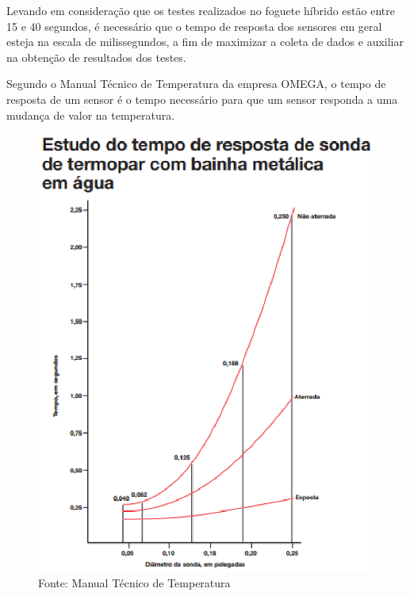 Levando em consideração que os testes realizados no foguete híbrido estão entre 15 e 40 segundos, é necessário que o tempo de resposta dos sensores em geral esteja na escala de milissegundos, a fim de maximizar a coleta de dados e auxiliar na obtenção de resultados dos testes.

Segundo o Manual Técnico de Temperatura da empresa OMEGA, o tempo de resposta de um sensor é o tempo necessário para que um sensor responda a uma mudança de valor na temperatura.
\begin{figure}[!htb]                  
	\centering                          
	\includegraphics[scale=1.0]{figuras/Figura3.eps}
	\caption{Fonte: Manual Técnico de Temperatura}             
\end{figure}

\newpage

